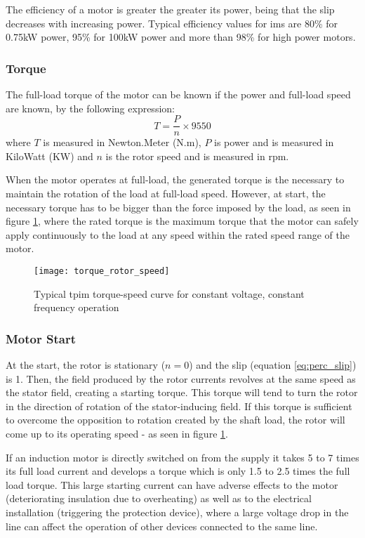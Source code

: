 The efficiency of a motor is greater the greater its power, being that the slip decreases with increasing power. Typical efficiency values for \acrshort{ims} are 80\% for 0.75kW power, 95\% for 100kW power and more than 98\% for high power motors.

\subsubsection{Torque}

The full-load torque of the motor can be known if the power and full-load speed are known, by the following expression:
\begin{equation} \label{eq:efficiency_max}
	T = \frac{P}{n}\times 9550
\end{equation}
where $T$ is measured in Newton.Meter (N.m), $P$ is power and is measured in KiloWatt (KW) and $n$ is the rotor speed and is measured in rpm.

When the motor operates at full-load, the generated torque is the necessary to maintain the rotation of the load at full-load speed. However, at start, the necessary torque has to be bigger than the force imposed by the load, as seen in figure \ref{fig:torque_speed_curve}, where the rated torque is the maximum torque that the motor can safely apply continuously to the load at any speed within the rated speed range of the motor.

\begin{figure}[htbp]
	\centering
	\texttt{[image: torque\_rotor\_speed]}
	\caption{Typical \acrshort{tpim} torque-speed curve for constant voltage, constant frequency operation}
	\label{fig:torque_speed_curve}
\end{figure}

\subsubsection{Motor Start}

At the start, the rotor is stationary ($n = 0$) and the slip (equation \ref{eq:perc_slip}) is 1. Then, the field produced by the rotor currents revolves at the same speed as the stator field, creating a starting torque. 
This torque will tend to turn the rotor in the direction of rotation of the stator-inducing field. If this torque is sufficient to overcome the opposition to rotation created by the shaft load, the rotor will come up to its operating speed - as seen in figure \ref{fig:torque_speed_curve}.

If an induction motor is directly switched on from the supply it takes 5 to 7 times its full load current and develops a torque which is only 1.5 to 2.5 times the full load torque. 
This large starting current can have adverse effects to the motor (deteriorating insulation due to overheating) as well as to the electrical installation (triggering the protection device), where a large voltage drop in the line can affect the operation of other devices connected to the same line.

